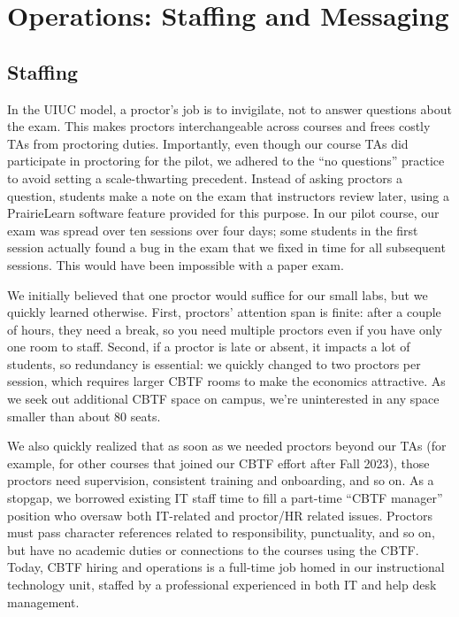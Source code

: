 \section{Operations: Staffing and Messaging}
\label{sec:ops}

\subsection{Staffing}


In the UIUC model, a proctor's job is to invigilate, not to answer questions about
the exam.  This makes proctors interchangeable across courses and frees costly
TAs from proctoring duties.
Importantly, even though our course TAs did participate in proctoring
for the pilot, we adhered to the ``no questions'' practice to avoid setting a
scale-thwarting precedent.
Instead of asking proctors a question,  students make a note on the
exam that instructors review later, using a PrairieLearn
software feature provided for this purpose.
In our pilot course, our exam was spread over ten sessions over four days;
some students in the first session actually found a
bug in the exam that we fixed in time for all subsequent sessions.
This would have been impossible with a paper exam.

We initially believed that one
proctor would suffice for our
small labs, but we quickly learned otherwise.  First, proctors'
attention span is finite: after a couple of hours, they need a break,
so you need multiple proctors even if you have only one room to staff.
Second, if a proctor is late or absent,
it impacts a lot of students, so redundancy is essential: we quickly
changed to two proctors per session,
which requires
larger CBTF rooms to make the economics attractive.  As we seek out
additional CBTF space on campus, 
we're uninterested in any space smaller than about 80 seats.

We also quickly realized that as soon as we needed proctors beyond
our TAs (for example, for other courses that joined our CBTF effort
after Fall 2023), those proctors need supervision, consistent
training and onboarding, and so on.  As a stopgap, we borrowed
existing IT staff time to fill a part-time
``CBTF manager'' position who oversaw both IT-related and proctor/HR
related issues.  
Proctors must pass character references related to
responsibility, punctuality, and so on, but have no academic
duties or connections to the courses using the CBTF.
Today, CBTF hiring and operations is a full-time job homed in our instructional
technology unit, staffed by a professional
experienced in both IT and help desk
management.


